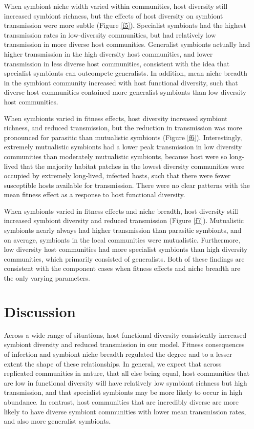 \documentclass[12pt]{article}
\begin{document}
When symbiont niche width varied within communities, host diversity still increased symbiont richness, but the effects of host diversity on symbiont transmission were more subtle (Figure \ref{f5}). 
Specialist symbionts had the highest transmission rates in low-diversity communities, but had relatively low transmission in more diverse host communities. 
Generalist symbionts actually had higher transmission in the high diversity host communities, and lower transmission in less diverse host communities, consistent with the idea that specialist symbionts can outcompete generalists. 
In addition, mean niche breadth in the symbiont community increased with host functional diversity, such that diverse host communities contained more generalist symbionts than low diversity host communities. 

When symbionts varied in fitness effects, host diversity increased symbiont richness, and reduced transmission, but the reduction in transmission was more pronounced for parasitic than mutualistic symbionts (Figure \ref{f6}). 
Interestingly, extremely mutualistic symbionts had a lower peak transmission in low diversity communities than moderately mutualistic symbionts, because host were so long-lived that the majority habitat patches in the lowest diversity communities were occupied by extremely long-lived, infected hosts, such that there were fewer susceptible hosts available for transmission. 
There were no clear patterns with the mean fitness effect as a response to host functional diversity. 

When symbionts varied in fitness effects and niche breadth, host diversity still increased symbiont diversity and reduced transmission (Figure \ref{f7}). 
Mutualistic symbionts nearly always had higher transmission than parasitic symbionts, and on average, symbionts in the local communities were mutualistic. 
Furthermore, low diversity host communities had more specialist symbionts than high diversity communities, which primarily consisted of generalists. 
Both of these findings are consistent with the component cases when fitness effects and niche breadth are the only varying parameters.

\section*{Discussion}

Across a wide range of situations, host functional diversity consistently increased symbiont diversity and reduced transmission in our model. 
Fitness consequences of infection and symbiont niche breadth regulated the degree and to a lesser extent the shape of these relationships.
In general, we expect that across replicated communities in nature, that all else being equal, host communities that are low in functional diversity will have relatively low symbiont richness but high transmission, and that specialist symbionts may be more likely to occur in high abundance. 
In contrast, host communities that are incredibly diverse are more likely to have diverse symbiont communities with lower mean transmission rates, and also more generalist symbionts. 
\end{document}
